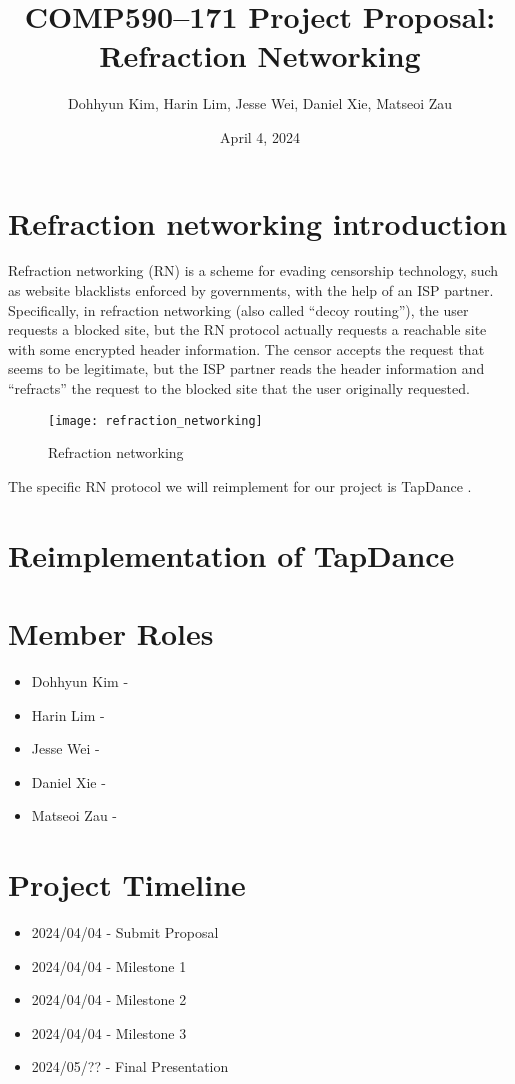 \documentclass{article}
\title{COMP590--171 Project Proposal: Refraction Networking}
\author{Dohhyun Kim, Harin Lim, Jesse Wei, Daniel Xie, Matseoi Zau}
\date{April 4, 2024}
\begin{document}
\maketitle

\section{Refraction networking introduction}

Refraction networking (RN) is a scheme for evading censorship technology, such as website blacklists enforced by governments, with the help of an ISP partner. Specifically, in refraction networking (also called ``decoy routing''), the user requests a blocked site, but the RN protocol actually requests a reachable site with some encrypted header information. The censor accepts the request that seems to be legitimate, but the ISP partner reads the header information and ``refracts'' the request to the blocked site that the user originally requested.

\begin{figure}[h]
    \centering
    \texttt{[image: refraction\_networking]}
    \caption{Refraction networking \cite{refraction_network}}
\end{figure}

The specific RN protocol we will reimplement for our project is TapDance \cite{tapdance}.

\section{Reimplementation of TapDance}

\section{Member Roles}

\begin{itemize}
\item Dohhyun Kim - 
\item Harin Lim - 
\item Jesse Wei - 
\item Daniel Xie - 
\item Matseoi Zau - 
\end{itemize}

\section{Project Timeline}

\begin{itemize}
\item 2024/04/04 - Submit Proposal 
\item 2024/04/04 - Milestone 1 
\item 2024/04/04 - Milestone 2  
\item 2024/04/04 - Milestone 3  
\item 2024/05/?? - Final Presentation 
\end{itemize}

\newpage
\printbibliography

% 
\end{document}
